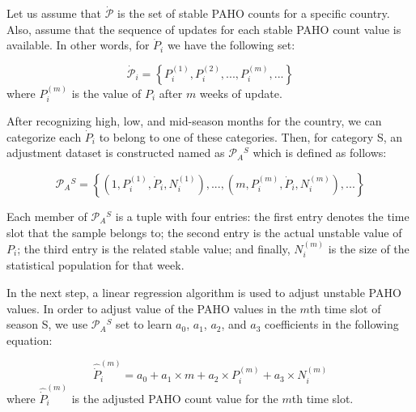 Let us assume that $\dot{\mathcal{P}}$ is the set of stable PAHO counts for a
specific country. Also, assume that the sequence of updates for each stable PAHO
count value is available. In other words, for $\dot{P}_i$ we have the following
set:
 
\begin{equation}
\dot{\mathcal{P}}_i = \left \{P_i^{(1)},P_i^{(2)},...,P_i^{(m)},...  \right \}
\end{equation}
\noindent
where $P_i^{(m)}$ is the value of $P_i$ after $m$ weeks of update.

After recognizing high, low, and mid-season months for the country, we can
categorize each $\dot{P}_i$ to belong to one of these categories. Then, for
category S, an adjustment dataset is constructed named as $\mathcal{P}_A{^S}$
which is defined as follows:

\begin{equation}
\mathcal{P}_A{^S} = \left \{ (1,P_i^{(1)},\dot{P}_i,N_i^{(1)}),...,(m,P_i^{(m)},\dot{P}_i,N_i^{(m)}), ...  \right \}
\end{equation}

Each member of $\mathcal{P}_A{^S}$ is a tuple with four entries: the first entry denotes
the time slot that the sample belongs to; the second entry is the actual unstable
value of $P_i$; the third entry is the related stable value; and finally,
$N_i^{(m)}$ is the size of the statistical population for that week.

In the next step, a linear regression algorithm is used to adjust unstable PAHO
values. In order to adjust value of the PAHO values in the $m$th time slot of
season S, we use $\mathcal{P}_A{^S}$ set to learn $a_0$, $a_1$, $a_2$, and
$a_3$ coefficients in the following equation:

\begin{equation}
\hat{\dot{P}}_i^{(m)} = a_0 + a_1 \times m + a_2 \times P_i^{(m)} + a_3 \times N_i^{(m)}
\label{eq:correctionpaho}
\end{equation}
\noindent
where $\hat{\dot{P}}_i^{(m)}$ is the adjusted PAHO count value for the $m$th time slot.


